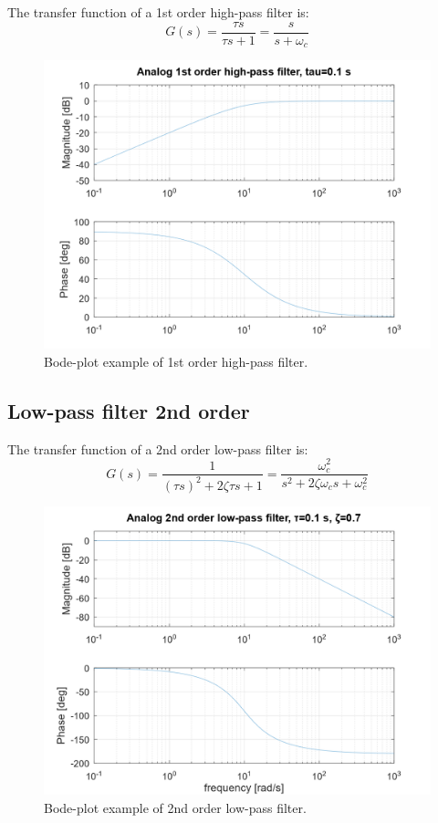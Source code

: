 \documentclass[]{book}
\begin{document}
The transfer function of a 1st order high-pass filter is:
\[
G(s) =  \frac{\tau s}{\tau s + 1} = \frac{s}{s + \omega_c}
\label{eq:hpf1}
\]

\begin{figure}
\includegraphics[width=0.8\linewidth]{images/filters/hpf_1st} \caption{Bode-plot example of 1st order high-pass filter.}\label{fig:unnamed-chunk-2}
\end{figure}

\hypertarget{low-pass-filter-2nd-order}{%
\subsection{Low-pass filter 2nd order}\label{low-pass-filter-2nd-order}}

The transfer function of a 2nd order low-pass filter is:
\[
G(s) =  \frac{1}{(\tau s)^2 + 2\zeta \tau s + 1} = \frac{\omega_c^2}{s^2 + 2\zeta \omega_c s + \omega_c^2}
\label{eq:lpf2}
\]

\begin{figure}
\includegraphics[width=0.8\linewidth]{images/filters/lpf_2nd} \caption{Bode-plot example of 2nd order low-pass filter.}\label{fig:unnamed-chunk-3}
\end{figure}
\end{document}
